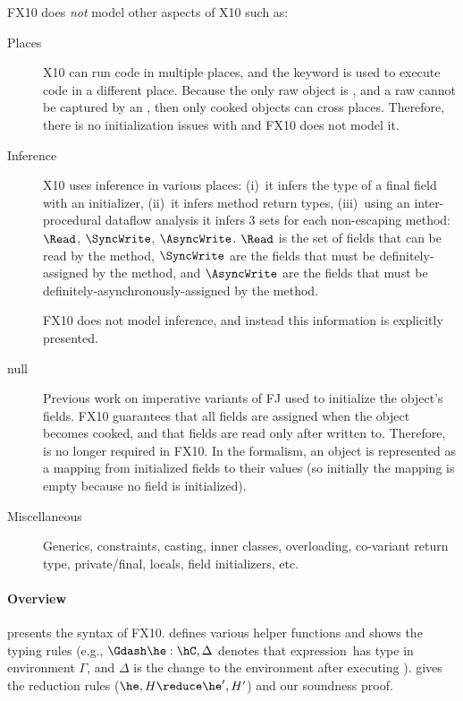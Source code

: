 \documentclass[a4paper]{article}
\begin{document}
FX10 does \emph{not} model other aspects of X10 such as:
\begin{description}
  \item[Places] X10 can run code in multiple places, and the  keyword is used to execute code in a different place.
    Because the only raw object is \this,
        and a raw \this cannot be captured by an ,
        then only cooked objects can cross places.
    Therefore, there is no initialization issues with  and FX10 does not model it.
  \item[Inference]
    X10 uses inference in various places:
        (i)~it infers the type of a final field with an initializer,
        (ii)~it infers method return types,
        (iii)~using an inter-procedural dataflow analysis it infers
            3 sets for each non-escaping method: $\Read$, $\SyncWrite$, $\AsyncWrite$.
            $\Read$ is the set of fields that can be read by the method,
                $\SyncWrite$ are the fields that must be definitely-assigned by the method,
                and $\AsyncWrite$ are the fields that must be definitely-asynchronously-assigned by the method.

    FX10 does not model inference, and instead this information is explicitly presented.
  \item[null]
    Previous work on imperative variants of FJ used \hnull to initialize the object's fields.
    FX10 guarantees that all fields are assigned when the object becomes cooked,
        and that fields are read only after written to.
    Therefore, \hnull is no longer required in FX10.
    In the formalism, an object is represented as a mapping from initialized fields to their values
    (so initially the mapping is empty because no field is initialized).

  \item[Miscellaneous]
    Generics, constraints, casting, inner classes, overloading, co-variant return type, private/final,
    locals, field initializers, etc.
\end{description}


\paragraph{Overview}
 presents the syntax of FX10.
 defines various helper functions and shows the typing rules
    (e.g., $\Gdash \he:\hC, \Delta$ denotes that expression~\he has type \hC in environment $\Gamma$, and $\Delta$ is the change to the environment after executing \he).
 gives the reduction rules ($\he,H \reduce \he',H'$) and our soundness proof.
\end{document}
